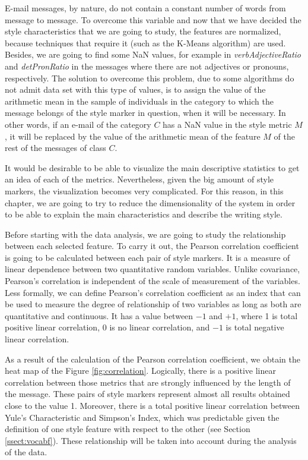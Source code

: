 E-mail messages, by nature, do not contain a constant number of words from message to message. To overcome this variable and now that we have decided the style characteristics that we are going to study, the features are normalized, because techniques that require it (such as the K-Means algorithm) are used. Besides, we are going to find some NaN values, for example in \textit{verbAdjectiveRatio} and \textit{detPronRatio} in the messages where there are not adjectives or pronouns, respectively. The solution to overcome this problem, due to some algorithms do not admit data set with this type of values, is to assign the value of the arithmetic mean in the sample of individuals in the category to which the message belongs of the style marker in question, when it will be necessary. In other words, if an e-mail of the category $C$ has a NaN value in the style metric $M$, it will be replaced by the value of the arithmetic mean of the feature $M$ of the rest of the messages of class $C$.

It would be desirable to be able to visualize the main descriptive statistics to get an idea of each of the metrics. Nevertheless, given the big amount of style markers, the visualization becomes very complicated. For this reason, in this chapter, we are going to try to reduce the dimensionality of the system in order to be able to explain the main characteristics and describe the writing style.

Before starting with the data analysis, we are going to study the relationship between each selected feature. To carry it out, the Pearson correlation coefficient \citep{benesty2009pearson} is going to be calculated between each pair of style markers. It is a measure of linear dependence between two quantitative random variables. Unlike covariance, Pearson's correlation is independent of the scale of measurement of the variables. Less formally, we can define Pearson's correlation coefficient as an index that can be used to measure the degree of relationship of two variables as long as both are quantitative and continuous. It has a value between $-1$ and $+1$, where 1 is total positive linear correlation, $0$ is no linear correlation, and $-1$ is total negative linear correlation.

As a result of the calculation of the Pearson correlation coefficient, we obtain the heat map of the Figure \ref{fig:correlation}. Logically, there is a positive linear correlation between those metrics that are strongly influenced by the length of the message. These pairs of style markers represent almost all results obtained close to the value 1. Moreover, there is a total positive linear correlation between Yule's Characteristic and Simpson's Index, which was predictable given the definition of one style feature with respect to the other (see Section \ref{ssect:vocabf}). These relationship will be taken into account during the analysis of the data.